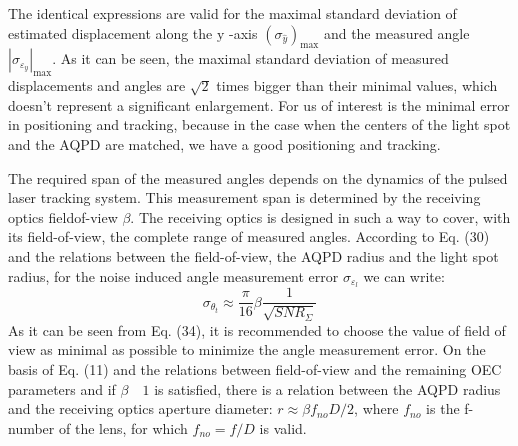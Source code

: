 \documentclass[10pt]{article}
\begin{document}
The identical expressions are valid for the maximal standard deviation of estimated displacement along the \(\mathrm{y}\) -axis \(\left(\sigma_{\hat{y}}\right)_{\max }\) and the measured angle \(\left|\sigma_{\varepsilon_{y}}\right|_{\max } .\) As it can be seen, the maximal standard deviation of measured displacements and angles are \(\sqrt{2}\) times bigger than their minimal values, which doesn't represent a significant enlargement. For us of interest is the minimal error in positioning and tracking, because in the case when the centers of the light spot and the AQPD are matched, we have a good positioning and tracking.

The required span of the measured angles depends on the dynamics of the pulsed laser tracking system. This measurement span is determined by the receiving optics fieldof-view \(\beta\). The receiving optics is designed in such a way to cover, with its field-of-view, the complete range of measured angles. According to Eq. (30) and the relations between the field-of-view, the AQPD radius and the light spot radius, for the noise induced angle measurement error \(\sigma_{\varepsilon_{l}}\) we can write:
\[
\sigma_{\theta_{t}} \approx \frac{\pi}{16} \beta \frac{1}{\sqrt{S N R_{\Sigma}}}
\]
As it can be seen from Eq. (34), it is recommended to choose the value of field of view as minimal as possible to minimize the angle measurement error. On the basis of Eq. (11) and the relations between field-of-view and the remaining OEC parameters and if \(\beta \quad 1\) is satisfied, there is a relation between the AQPD radius and the receiving optics aperture diameter: \(r \approx \beta f_{n o} D / 2\), where \(f_{n o}\) is the f-number of the lens, for which \(f_{n o}=f / D\) is valid.
\end{document}
